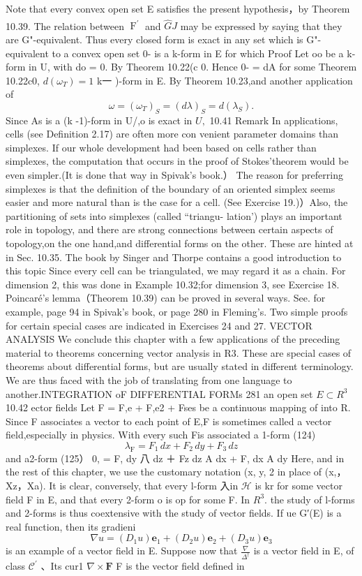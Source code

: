 Note that every convex open set E satisfies the present hypothesis，by Theorem 10.39. The relation between ${\widehat{\operatorname{F}^{\prime}}}$ and ${\hat{G}}J$ may be expressed by saying that they are G"-equivalent. Thus every closed form is exact in any set which is G"-equivalent to a convex open set 0- is a k-form in E for which Proof Let oo be a k-form in U, with do = 0. By Theorem 10.22(c 0. Hence 0- = dA for some Theorem 10.22c0, $d(\omega_{T})=1$ k一 )-form in E. By Theorem 10.23,and another application of $$ \omega=(\omega_{T})_{S}=(d\lambda)_{S}=d(\lambda_{S}). $$ Since As is a (k -1)-form in U/,o is exact in $U,$ 10.41 Remark In applications, cells (see Definition 2.17) are often more con venient parameter domains than simplexes. If our whole development had been based on cells rather than simplexes, the computation that occurs in the proof of Stokes'theorem would be even simpler.(It is done that way in Spivak's book.） The reason for preferring simplexes is that the definition of the boundary of an oriented simplex seems easier and more natural than is the case for a cell. (See Exercise 19.)）Also, the partitioning of sets into simplexes (called “triangu- lation') plays an important role in topology, and there are strong connections between certain aspects of topology,on the one hand,and differential forms on the other. These are hinted at in Sec. 10.35. The book by Singer and Thorpe contains a good introduction to this topic Since every cell can be triangulated, we may regard it as a chain. For dimension 2, this was done in Example 10.32;for dimension 3, see Exercise 18. Poincaré's lemma（Theorem 10.39) can be proved in several ways. See. for example, page 94 in Spivak's book, or page 280 in Fleming's. Two simple proofs for certain special cases are indicated in Exercises 24 and 27. VECTOR ANALYSIS We conclude this chapter with a few applications of the preceding material to theorems concerning vector analysis in R3. These are special cases of theorems about differential forms, but are usually stated in different terminology. We are thus faced with the job of translating from one language to another.INTEGRATION oF DIFFERENTIAL FORMs 281 an open set $E\subset R^{3}$ 10.42 ector fields Let F = F,e + F,e2 + Fses be a continuous mapping of into R. Since F associates a vector to each point of E,F is sometimes called a vector field,especially in physics. With every such Fis associated a 1-form (124) $$ \lambda_{\mathrm{F}}=F_{1}\,d x+F_{2}\,d y+F_{3}\,d z $$ and a2-form (125） 0, = F, dy 八 dz ＋ Fz dz A dx + F, dx A dy Here, and in the rest of this chapter, we use the customary notation (x, y, 2 in place of (x,，Xz，Xa). It is clear, conversely, that every l-form 入in ${\mathcal{H}}$ is kr for some vector field F in E, and that every 2-form o is op for some F. In $R^{3}.$ the study of l-forms and 2-forms is thus coextensive with the study of vector fields. If ue G′(E) is a real function, then its gradieni $$ \nabla u=(D_{1}u)\mathbf{e}_{1}+(D_{2}u)\mathbf{e}_{2}+(D_{3}u)\mathbf{e}_{3} $$ is an example of a vector field in E. Suppose now that $\textstyle{\frac{\nabla}{\Delta^{\dagger}}}$ is a vector field in E, of class ${\mathcal{C}}^{\prime}$ 、Its cur1 $\nabla\times\mathbf{F}$ F is the vector field defined in 